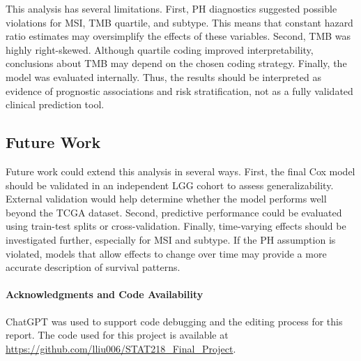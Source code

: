 \documentclass[paper=a4, fontsize=11pt]{scrartcl}
\numberwithin{equation}{section}		%
\numberwithin{figure}{section}			%
\numberwithin{table}{section}				%
\begin{document}
This analysis has several limitations. First, PH diagnostics suggested possible violations for MSI, TMB quartile, and subtype. This means that constant hazard ratio estimates may oversimplify the effects of these variables. Second, TMB was highly right-skewed. Although quartile coding improved interpretability, conclusions about TMB may depend on the chosen coding strategy. Finally, the model was evaluated internally. Thus, the results should be interpreted as evidence of prognostic associations and risk stratification, not as a fully validated clinical prediction tool.

\subsection{Future Work}

Future work could extend this analysis in several ways. First, the final Cox model should be validated in an independent LGG cohort to assess generalizability. External validation would help determine whether the model performs well beyond the TCGA dataset. Second, predictive performance could be evaluated using train-test splits or cross-validation. Finally, time-varying effects should be investigated further, especially for MSI and subtype. If the PH assumption is violated, models that allow effects to change over time may provide a more accurate description of survival patterns.  

\paragraph{Acknowledgments and Code Availability} ChatGPT was used to support code debugging and the editing process for this report. The code used for this project is available at \url{https://github.com/lliu006/STAT218_Final_Project}.



\end{document}
